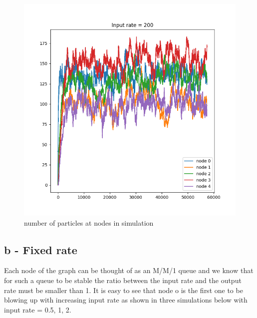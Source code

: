 \documentclass{article}
\begin{document}
\begin{figure}[!htbp]
    \centering
    \includegraphics[width=\linewidth]{fig/proportional_200}   
    \caption{number of particles at nodes in simulation}
    \label{fig:figure6}
\end{figure}


\subsection{b - Fixed rate}
Each node of the graph can be thought of as an M/M/1 queue and we know that for such a queue to be stable
the ratio between the input rate and the output rate must be smaller than 1. It is easy to see that node o is the first one to be blowing up
with increasing input rate as shown in three simulations below with input rate = 0.5, 1, 2.
\end{document}
